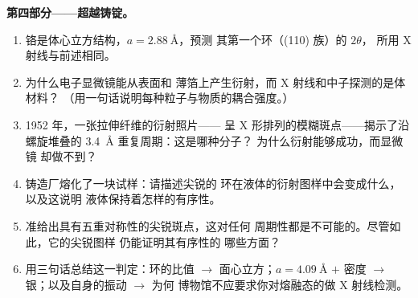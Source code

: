\begin{problem}
\medskip\noindent\textbf{第四部分——超越铸锭。}

\begin{enumerate}[resume]
  \item 铬是体心立方结构，$a = \qty{2.88}{\angstrom}$，预测
        其第一个环（(110) 族）的 $2\theta$，
        所用 X 射线与前述相同。
  \item 为什么电子显微镜能从表面和
        薄箔上产生衍射，而 X 射线和中子探测的是体材料？
        （用一句话说明每种粒子与物质的耦合强度。）
  \item 1952 年，一张拉伸纤维的衍射照片——
        呈 X 形排列的模糊斑点——揭示了沿螺旋堆叠的
        \qty{3.4}{\angstrom} 重复周期：这是哪种分子？
        为什么衍射能够成功，而显微镜
        却做不到？
  \item 铸造厂熔化了一块试样：请描述尖锐的
        环在液体的衍射图样中会变成什么，以及这说明
        液体保持着怎样的有序性。
  \item 准给出具有五重对称性的尖锐斑点，这对任何
        周期性都是不可能的。尽管如此，它的尖锐图样
        仍能证明其有序性的
        哪些方面？
  \item 用三句话总结这一判定：环的比值
        $\to$ 面心立方；$a = \qty{4.09}{\angstrom}$ $+$ 密度 $\to$
        银；以及自身的振动 $\to$ 为何
        博物馆不应要求你对熔融态的做 X 射线检测。
\end{enumerate}
\end{problem}
